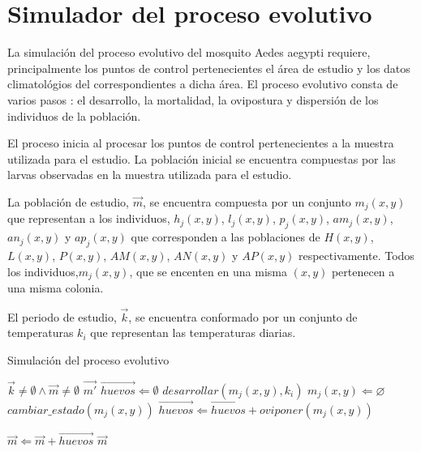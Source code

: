 \section{Simulador del proceso evolutivo}
\label{sec:cap4-simulador-proceso-evolutivo}
La simulación del proceso evolutivo del mosquito Aedes aegypti requiere, principalmente los
puntos de control pertenecientes el área de estudio y los datos climatológios del correspondientes
a dicha área. El proceso evolutivo consta de varios pasos : el desarrollo, la mortalidad,
la ovipostura y dispersión de los individuos de la población.

El proceso inicia al procesar los puntos de control pertenecientes a la muestra utilizada para el
estudio. La población inicial se encuentra compuestas por las larvas observadas en la muestra
utilizada para el estudio.

La población de estudio, $\vec{m}$, se encuentra compuesta por un conjunto $m_{j}(x,y)$ que representan a los individuos, $h_{j}(x,y)$, $l_{j}(x,y)$, $p_{j}(x,y)$, $am_{j}(x,y)$,
$an_{j}(x,y)$ y $ap_{j}(x,y)$ que corresponden a las poblaciones de $H(x,y)$, $L(x,y)$, $P(x,y)$,
$AM(x,y)$, $AN(x,y)$ y $AP(x,y)$ respectivamente. Todos los individuos,$m_{j}(x,y)$, que se
encenten en una misma $(x, y)$ pertenecen a una misma colonia.

El periodo de estudio, $\vec{k}$, se encuentra conformado por un conjunto de temperaturas $k_{i}$
que representan las temperaturas diarias.

\begin{algorithm}
\caption{Simulación del proceso evolutivo}
\label{alg:simulador-evolutivo}
\begin{algorithmic}[1]
    \REQUIRE $\vec{k}\neq \emptyset \land \vec{m} \neq \emptyset$
    \ENSURE $\vec{m'}$
        \STATE $\vec{huevos} \Leftarrow \emptyset$
            \STATE $desarrollar(m_{j}(x, y), k_{i})$
                \STATE {}
                \STATE $m_{j}(x, y) \Leftarrow \varnothing $
                \STATE $ cambiar\_estado(m_{j}(x, y)) $
                \STATE $\vec{huevos} \Leftarrow \vec{huevos} + oviponer(m_{j}(x, y))$
            \ENDIF
        \ENDFOR

            \STATE {}
            \STATE $\vec{m} \Leftarrow  \vec{m} + \vec{huevos}$
        \ENDIF
    \ENDFOR
    \RETURN $\vec{m}$
\end{algorithmic}
\end{algorithm}

